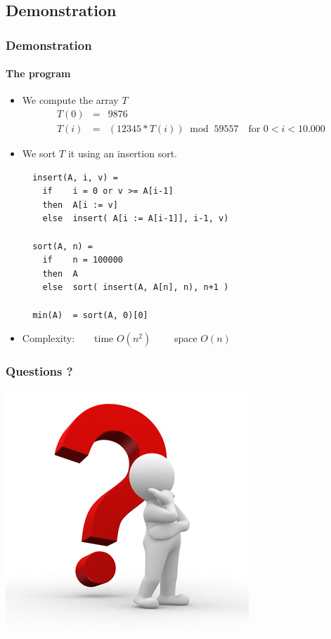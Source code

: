 \documentclass{beamer}
\begin{document}
\subsection{Demonstration}


\begin{frame}[fragile]
\frametitle{Demonstration}
\framesubtitle{The program}
\begin{itemize}
\item  We compute the array $T$ 
\begin{eqnarray*}
T(0) &=& 9876 \\
T(i) &=& ( 12345 * T(i) ) \ \text{ mod } \ 59557 \ \ \ \text{ for $0 < i < 10.000$} 
\end{eqnarray*}
\item We sort $T$ it using an insertion sort.
\begin{lstlisting}
  insert(A, i, v) =
    if    i = 0 or v >= A[i-1]
    then  A[i := v]
    else  insert( A[i := A[i-1]], i-1, v)

  sort(A, n) =
    if    n = 100000
    then  A
    else  sort( insert(A, A[n], n), n+1 )

  min(A)  = sort(A, 0)[0]
\end{lstlisting}
\item Complexity:\ \ \ \  time $O(n^2)$ \ \ \ \ space $O(n)$
\end{itemize}


\end{frame}


\begin{frame}
\frametitle{Questions ?}
\begin{center}
\includegraphics[scale=0.5]{includes/questions.jpg}
\end{center}
\end{frame}
\end{document}
